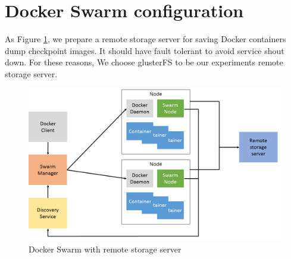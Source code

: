 \section{Docker Swarm configuration}
As Figure \ref{fig:Docker Swarm with remote storage server}, we prepare a remote storage server for saving Docker containers dump checkpoint images. It should have fault tolerant to avoid service shout down. For these reasons, We choose glusterFS to be our experiments remote storage server.

\begin{figure}[h]
\begin{center}
\includegraphics[width=15cm]{figure/swarm_docker_remote.png}
\end{center}
\caption{Docker Swarm with remote storage server}
\label{fig:Docker Swarm with remote storage server}
\end{figure}

